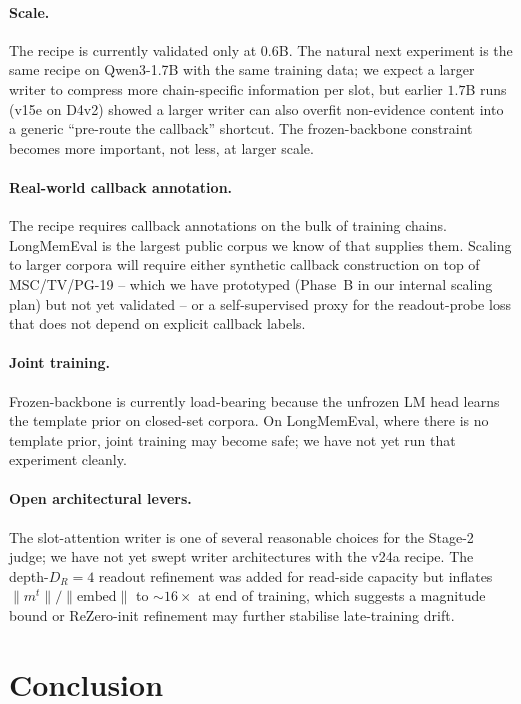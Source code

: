 \documentclass[11pt]{article}
\newcommand{\mt}{m^t}
\begin{document}
\paragraph{Scale.}
The recipe is currently validated only at $0.6$B. The natural next
experiment is the same recipe on Qwen3-1.7B with the same training
data; we expect a larger writer to compress more chain-specific
information per slot, but earlier $1.7$B runs (v15e on D4v2) showed a
larger writer can also overfit non-evidence content into a generic
``pre-route the callback'' shortcut. The frozen-backbone constraint
becomes more important, not less, at larger scale.

\paragraph{Real-world callback annotation.}
The recipe requires callback annotations on the bulk of training
chains. LongMemEval is the largest public corpus we know of that
supplies them. Scaling to larger corpora will require either
synthetic callback construction on top of MSC/TV/PG-19 -- which we
have prototyped (Phase~B in our internal scaling plan) but not yet
validated -- or a self-supervised proxy for the readout-probe loss
that does not depend on explicit callback labels.

\paragraph{Joint training.}
Frozen-backbone is currently load-bearing because the unfrozen LM
head learns the template prior on closed-set corpora. On
LongMemEval, where there is no template prior, joint training may
become safe; we have not yet run that experiment cleanly.

\paragraph{Open architectural levers.}
The slot-attention writer is one of several reasonable choices for
the Stage-2 judge; we have not yet swept writer architectures with
the v24a recipe. The depth-$D_R = 4$ readout refinement was added
for read-side capacity but inflates $\|\mt\|/\|\mathrm{embed}\|$ to
$\sim 16\times$ at end of training, which suggests a magnitude bound
or ReZero-init refinement may further stabilise late-training drift.

\section{Conclusion}
\label{sec:conclusion}
\end{document}
